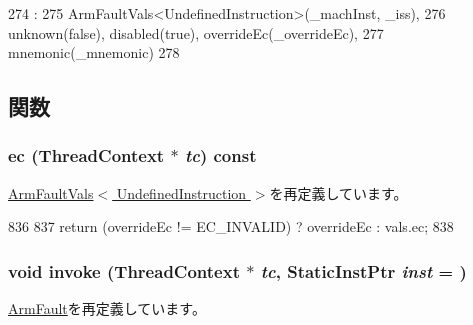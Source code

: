 \begin{DoxyCode}
274                                                                       :
275         ArmFaultVals<UndefinedInstruction>(_machInst, _iss),
276         unknown(false), disabled(true), overrideEc(_overrideEc),
277         mnemonic(_mnemonic)
278     {}

\end{DoxyCode}


\subsection{関数}
\hypertarget{classArmISA_1_1UndefinedInstruction_aefab73b22a74d7c48b8a23230906d7cd}{
\subsubsection[{ec}]{ ec ({\bf ThreadContext} $\ast$ {\em tc}) const}}
\label{classArmISA_1_1UndefinedInstruction_aefab73b22a74d7c48b8a23230906d7cd}


\hyperlink{classArmISA_1_1ArmFaultVals_aa4dd5fb47a1253dbe17e692e905a8c7c}{ArmFaultVals$<$ UndefinedInstruction $>$}を再定義しています。


\begin{DoxyCode}
836 {
837     return (overrideEc != EC_INVALID) ? overrideEc : vals.ec;
838 }
\end{DoxyCode}
\hypertarget{classArmISA_1_1UndefinedInstruction_a2bd783b42262278d41157d428e1f8d6f}{
\subsubsection[{invoke}]{\setlength{\rightskip}{0pt plus 5cm}void invoke ({\bf ThreadContext} $\ast$ {\em tc}, \/  {\bf StaticInstPtr} {\em inst} = {})}}
\label{classArmISA_1_1UndefinedInstruction_a2bd783b42262278d41157d428e1f8d6f}


\hyperlink{classArmISA_1_1ArmFault_a2bd783b42262278d41157d428e1f8d6f}{ArmFault}を再定義しています。


